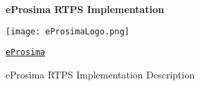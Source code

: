 \begin{center}{\bfseries e\-Prosima \-R\-T\-P\-S \-Implementation}\end{center} \par
 \begin{center}  
\begin{DoxyImageNoCaption}
  \mbox{\texttt{[image: eProsimaLogo.png]}}
\end{DoxyImageNoCaption}
 \par
\href{http://www.eprosima.com}{\tt e\-Prosima}\end{center} 

e\-Prosima \-R\-T\-P\-S \-Implementation \-Description 